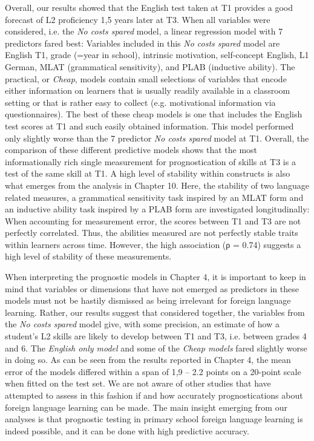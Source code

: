 \documentclass[output=paper]{langsci/langscibook}
\begin{document}
Overall, our results showed that the English test taken at T1 provides a good forecast of L2 proficiency 1,5 years later at T3. When all variables were considered, i.e. the \textit{No costs spared} model, a linear regression model with 7 predictors fared best: Variables included in this \textit{No costs spared} model are English T1, grade (=year in school), intrinsic motivation, self-concept English, L1 German, MLAT (grammatical sensitivity), and PLAB (inductive ability). The practical, or \textit{Cheap}, models contain small selections of variables that encode either information on learners that is usually readily available in a classroom setting or that is rather easy to collect (e.g. motivational information via questionnaires). The best of these cheap models is one that includes the English test scores at T1 and such easily obtained information. This model performed only slightly worse than the 7 predictor \textit{No costs spared} model at T1. Overall, the comparison of these different predictive models shows that the most informationally rich single measurement for prognostication of skills at T3 is a test of the same skill at T1. A high level of stability within constructs is also what emerges from the analysis in Chapter 10. Here,  the stability of two language related measures, a grammatical sensitivity task inspired by an MLAT form and an inductive ability task inspired by a PLAB form are investigated longitudinally: When accounting for measurement error, the scores between T1 and T3 are not perfectly correlated. Thus, the abilities measured are not perfectly stable traits within learners across time. However, the high association (ρ = 0.74) suggests a high level of stability of these measurements.

When interpreting the prognostic models in Chapter 4, it is important to keep in mind that variables or dimensions that have not emerged as predictors in these models must not be hastily dismissed as being irrelevant for foreign language learning. Rather, our results suggest that considered together, the variables from the \textit{No costs spared} model give, with some precision, an estimate of how a student’s L2 skills are likely to develop between T1 and T3, i.e. between grades 4 and 6. The \textit{English only model} and some of the \textit{Cheap models} fared slightly worse in doing so. As can be seen from the results reported in Chapter 4, the mean error of the models differed within a span of 1,9 – 2.2 points on a 20-point scale when fitted on the test set. We are not aware of other studies that have attempted to assess in this fashion if and how accurately prognostications about foreign language learning can be made. The main insight emerging from our analyses is that prognostic testing in primary school foreign language learning is indeed possible, and it can be done with high predictive accuracy.
\end{document}
